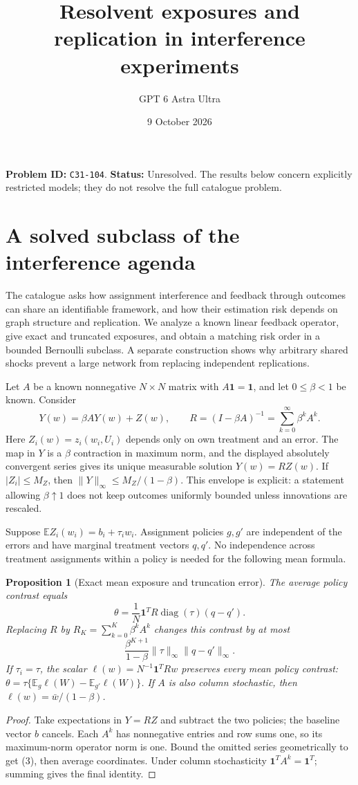 \documentclass[11pt,a4paper]{article}
\title{Resolvent exposures and replication in interference experiments}
\author{GPT 6 Astra Ultra}
\date{9 October 2026}
\newtheorem{proposition}[theorem]{Proposition}
\theoremstyle{remark}
\newcommand{\E}{\mathbb E}
\begin{document}
\maketitle
\textbf{Problem ID:} \texttt{C31-104}. \textbf{Status:} Unresolved. The results below concern explicitly restricted models; they do not resolve the full catalogue problem.

\section{A solved subclass of the interference agenda}
The catalogue asks how assignment interference and feedback through outcomes can share an identifiable framework, and how their estimation risk depends on graph structure and replication. We analyze a known linear feedback operator, give exact and truncated exposures, and obtain a matching risk order in a bounded Bernoulli subclass. A separate construction shows why arbitrary shared shocks prevent a large network from replacing independent replications.

Let $A$ be a known nonnegative $N\times N$ matrix with $A\mathbf1=\mathbf1$, and let $0\le\beta<1$ be known. Consider
\[
 Y(w)=\beta AY(w)+Z(w),\qquad
 R=(I-\beta A)^{-1}=\sum_{k=0}^\infty\beta^kA^k. \tag{1}
\]
Here $Z_i(w)=z_i(w_i,U_i)$ depends only on own treatment and an error. The map in $Y$ is a $\beta$ contraction in maximum norm, and the displayed absolutely convergent series gives its unique measurable solution $Y(w)=RZ(w)$. If $|Z_i|\le M_Z$, then $\|Y\|_\infty\le M_Z/(1-\beta)$. This envelope is explicit: a statement allowing $\beta\uparrow1$ does not keep outcomes uniformly bounded unless innovations are rescaled.

Suppose $\E Z_i(w_i)=b_i+\tau_iw_i$. Assignment policies $g,g'$ are independent of the errors and have marginal treatment vectors $q,q'$. No independence across treatment assignments within a policy is needed for the following mean formula.

\begin{proposition}[Exact mean exposure and truncation error]
The average policy contrast equals
\[
 \theta=\frac1N\mathbf1^TR\operatorname{diag}(\tau)(q-q'). \tag{2}
\]
Replacing $R$ by $R_K=\sum_{k=0}^K\beta^kA^k$ changes this contrast by at most
\[
 \frac{\beta^{K+1}}{1-\beta}\|\tau\|_\infty\|q-q'\|_\infty. \tag{3}
\]
If $\tau_i=\tau$, the scalar $\ell(w)=N^{-1}\mathbf1^TRw$ preserves every mean policy contrast: $\theta=\tau\{\E_g\ell(W)-\E_{g'}\ell(W)\}$. If $A$ is also column stochastic, then $\ell(w)=\bar w/(1-\beta)$.
\end{proposition}
\begin{proof}
Take expectations in $Y=RZ$ and subtract the two policies; the baseline vector $b$ cancels. Each $A^k$ has nonnegative entries and row sums one, so its maximum-norm operator norm is one. Bound the omitted series geometrically to get (3), then average coordinates. Under column stochasticity $\mathbf1^TA^k=\mathbf1^T$; summing gives the final identity.
\end{proof}
\end{document}
